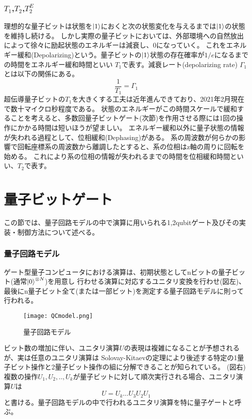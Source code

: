         \subsubsection{$T_1$,$T_2$,$T_2^E$}
        理想的な量子ビットは状態を$\ket{1}$におくと次の状態変化を与えるまでは$\ket{1}$の状態を維持し続ける。
        しかし実際の量子ビットにおいては、外部環境への自然放出によって徐々に励起状態のエネルギーは減衰し、0になっていく。
        これをエネルギー緩和(Depolarizing)という。量子ビットの$\ket{1}$状態の存在確率が$1/e$になるまでの時間をエネルギー緩和時間といい
        $T_1$で表す。減衰レート(depolarizing rate) $\Gamma_{1}$とは以下の関係にある。
        \begin{equation}
            \frac{1}{T_1} = \Gamma_{1}
        \end{equation}
        超伝導量子ビットの$T_1$を大きくする工夫は近年進んできており、2021年2月現在で数十マイクロ秒程度である。
        状態のエネルギーがこの時間スケールで緩和することを考えると、多数回量子ビットゲート(次節)を作用させる際には1回の操作にかかる時間は短いほうが望ましい。
        エネルギー緩和以外に量子状態の情報が失われる過程として、位相緩和(Dephasing)がある。
        系の周波数が何らかの影響で回転座標系の周波数から離調したとすると、系の位相はz軸の周りに回転を始める。
        これにより系の位相の情報が失われるまでの時間を位相緩和時間といい、$T_2$で表す。
        

\section{量子ビットゲート}
    この節では、量子回路モデルの中で演算に用いられる1,2qubitゲート及びその実装・制御方法について述べる。
    \subsubsection{量子回路モデル}
    ゲート型量子コンピュータにおける演算は、初期状態としてnビットの量子ビット(通常$\ket{0}^{\otimes N}$)を用意し
    行わせる演算に対応するユニタリ変換を行わせ(図左)、最後にn量子ビット全て(または一部ビット)を測定する量子回路モデルに則って行われる。
    \begin{figure}[H]
        \begin{center}
            \texttt{[image: QCmodel.png]}
            \caption{量子回路モデル}
        \end{center}
    \end{figure}
    ビット数の増加に伴い、ユニタリ演算$U$の表現は複雑になることが予想されるが、実は任意のユニタリ演算は
    Solovay-Kitaevの定理により後述する特定の1量子ビット操作と2量子ビット操作の組に分解できることが知られている。
    (図右)\\
    複数の操作$U_1,U_2,..,U_k$が量子ビットに対して順次実行される場合、ユニタリ演算$U$は
    \begin{equation}
        U=U_k \dots U_3U_2U_1
    \end{equation}
    と書ける。量子回路モデルの中で行われるユニタリ演算を特に量子ゲートと呼ぶ。
